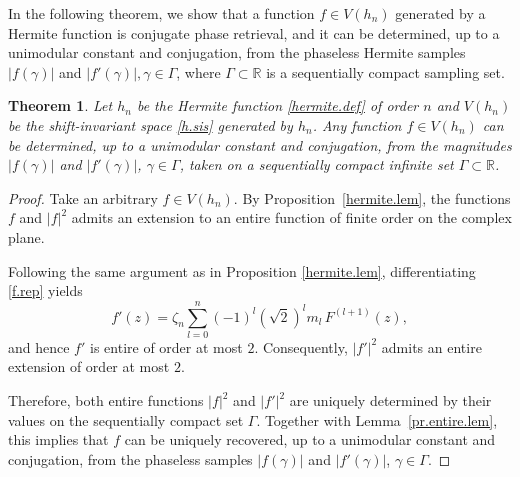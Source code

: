 \documentclass[11pt,oneside,reqno]{amsart}
\newtheorem{thm}{Theorem}[section]
\numberwithin{equation}{section}
\def\R{ {\mathbb R} }
\def\Z{ {\mathbb Z} }
\begin{document}
In the following theorem, we show that a function $f\in V(h_n)$ generated by a Hermite function is conjugate phase retrieval, and it can be determined, up to a unimodular constant and conjugation, from the phaseless Hermite samples $|f(\gamma)|$ and $|f'(\gamma)|, \gamma\in\Gamma$, where  $\Gamma\subset\R$ is a sequentially compact sampling set.

\begin{thm}\label{hermite.cpr.prop}
{\rm Let $h_n$ be the Hermite function \eqref{hermite.def} of order $n$ and $V(h_n)$  be the shift-invariant space \eqref{h.sis} generated by $h_n$. Any function $f\in V(h_n)$  %
can be determined, up to a unimodular constant and conjugation, from the magnitudes $|f(\gamma)|$ and $|f'(\gamma)|$, $\gamma\in\Gamma$, taken on a sequentially compact infinite set $\Gamma\subset \R$.} %
\end{thm}


 \begin{proof}
Take an arbitrary $f\in V(h_n)$.
By Proposition~\ref{hermite.lem}, the functions $f$  and $|f|^2$ admits an extension to an
entire function of finite order on the complex plane.




Following the same argument as in Proposition \ref{hermite.lem}, differentiating
\eqref{f.rep} yields
\[
f'(z)=\zeta_n\sum_{l=0}^n (-1)^l(\sqrt2)^l m_l\,F^{(l+1)}(z),
\]
and hence $f'$ is entire of order at most $2$. Consequently, $|f'|^2$ admits an
entire extension of order at most $2$.

Therefore, both entire functions $|f|^2$ and $|f'|^2$ are uniquely determined by
their values on the sequentially compact set $\Gamma$.
Together with Lemma~\ref{pr.entire.lem}, this implies that $f$ can be uniquely
recovered, up to a unimodular constant and conjugation, from the phaseless
samples $|f(\gamma)|$ and $|f'(\gamma)|$, $\gamma\in\Gamma$.
\end{proof}
\end{document}

